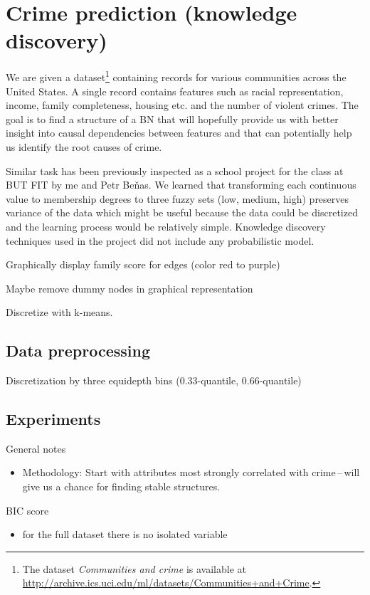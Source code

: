 \documentclass[english,cover]{fitthesis} %
\newcommand{\todo}[1]{{\color{red}#1}}
\begin{document}
\section{Crime prediction (knowledge discovery)}
We are given a dataset\footnote{The dataset \emph{Communities and crime} is available at \url{http://archive.ics.uci.edu/ml/datasets/Communities+and+Crime}.} containing records for various communities across the United States. A single record contains features such as racial representation, income, family completeness, housing etc. and the number of violent crimes. The goal is to find a structure of a BN that will hopefully provide us with better insight into causal dependencies between features and that can potentially help us identify the root causes of crime.

Similar task has been previously inspected as a school project for the  class at BUT FIT by me and Petr Beňas. We learned that transforming each continuous value to membership degrees to three fuzzy sets (low, medium, high) preserves variance of the data which might be useful because the data could be discretized and the learning process would be relatively simple. Knowledge discovery techniques used in the project did not include any probabilistic model.

\todo{Graphically display family score for edges (color red to purple)}

\todo{Maybe remove dummy nodes in graphical representation}

\todo{Discretize with k-means.}



\subsection{Data preprocessing}
Discretization by three equidepth bins (0.33-quantile, 0.66-quantile)


\subsection{Experiments}
General notes
\begin{itemize}
    \item Methodology: Start with attributes most strongly correlated with crime\,--\,will give us a chance for finding stable structures.
\end{itemize}

BIC score
\begin{itemize}
    \item for the full dataset there is no isolated variable
\end{itemize}
\end{document}
